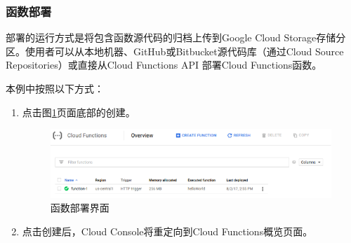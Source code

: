 \documentclass[11pt]{article}
\begin{document}
\subsubsection{函数部署}
部署的运行方式是将包含函数源代码的归档上传到Google Cloud Storage存储分区。使用者可以从本地机器、GitHub或Bitbucket源代码库（通过Cloud Source Repositories）或直接从Cloud Functions API 部署Cloud Functions函数。

本例中按照以下方式：
\begin{enumerate}
	\item 点击图\ref{fig16}页面底部的创建。
	\begin{figure}[h]	
		\centering
		\includegraphics[scale=0.6]{figs/16.png}        %
		\caption{函数部署界面}
		\label{fig16}	
	\end{figure}
	\item 点击创建后，Cloud Console将重定向到Cloud Functions概览页面。
\end{enumerate}	
\end{document}
